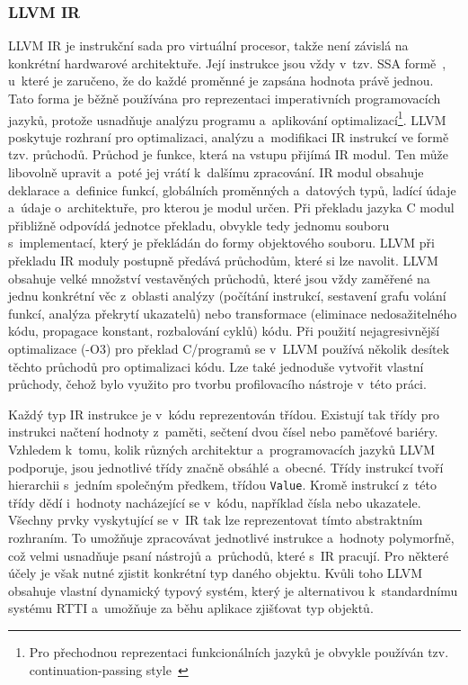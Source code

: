 \subsubsection*{LLVM IR}
LLVM IR je instrukční sada pro virtuální procesor, takže není závislá na konkrétní hardwarové architektuře. Její instrukce jsou vždy v~tzv. SSA formě~\cite{ssa1, ssa2}, u~které je zaručeno, že do každé proměnné je zapsána hodnota právě jednou. Tato forma je běžně používána pro reprezentaci imperativních programovacích jazyků, protože usnadňuje analýzu programu a~aplikování optimalizací\footnote{Pro přechodnou reprezentaci funkcionálních jazyků je obvykle používán tzv. continuation-passing style~\cite{cps}}. LLVM poskytuje rozhraní pro optimalizaci, analýzu a~modifikaci IR instrukcí ve formě tzv. průchodů.
Průchod je funkce, která na vstupu přijímá IR modul. Ten může libovolně upravit a~poté jej vrátí k~dalšímu zpracování. IR modul obsahuje deklarace a~definice funkcí, globálních proměnných a~datových typů, ladící údaje a~údaje o~architektuře, pro kterou je modul určen. Při překladu jazyka C modul přibližně odpovídá jednotce překladu, obvykle tedy jednomu souboru s~implementací, který je překládán do formy objektového souboru. LLVM při překladu IR moduly postupně předává průchodům, které si lze navolit. LLVM obsahuje velké množství vestavěných průchodů, které jsou vždy zaměřené na jednu konkrétní věc z~oblasti analýzy (počítání instrukcí, sestavení grafu volání funkcí, analýza překrytí ukazatelů) nebo transformace (eliminace nedosažitelného kódu, propagace konstant, rozbalování cyklů) kódu. Při použití nejagresivnější optimalizace (-O3) pro překlad C/\CPP \hspace{1mm}programů se v~LLVM používá několik desítek těchto průchodů pro optimalizaci kódu. Lze také jednoduše vytvořit vlastní průchody, čehož bylo využito pro tvorbu profilovacího nástroje v~této práci.

Každý typ IR instrukce je v~kódu reprezentován třídou. Existují tak třídy pro instrukci načtení hodnoty z~paměti, sečtení dvou čísel nebo paměťové bariéry. Vzhledem k~tomu, kolik různých architektur a~programovacích jazyků LLVM podporuje, jsou jednotlivé třídy značně obsáhlé a~obecné. Třídy instrukcí tvoří hierarchii s~jedním společným předkem, třídou \texttt{Value}. Kromě instrukcí z~této třídy dědí i~hodnoty nacházející se v~kódu, například čísla nebo ukazatele. Všechny prvky vyskytující se v~IR tak lze reprezentovat tímto abstraktním rozhraním. To umožňuje zpracovávat jednotlivé instrukce a~hodnoty polymorfně, což velmi usnadňuje psaní nástrojů a~průchodů, které s~IR pracují. Pro některé účely je však nutné zjistit konkrétní typ daného objektu. Kvůli toho LLVM obsahuje vlastní dynamický typový systém, který je alternativou k~standardnímu systému \CPP \hspace{1mm}RTTI a~umožňuje za běhu aplikace zjišťovat typ objektů.

